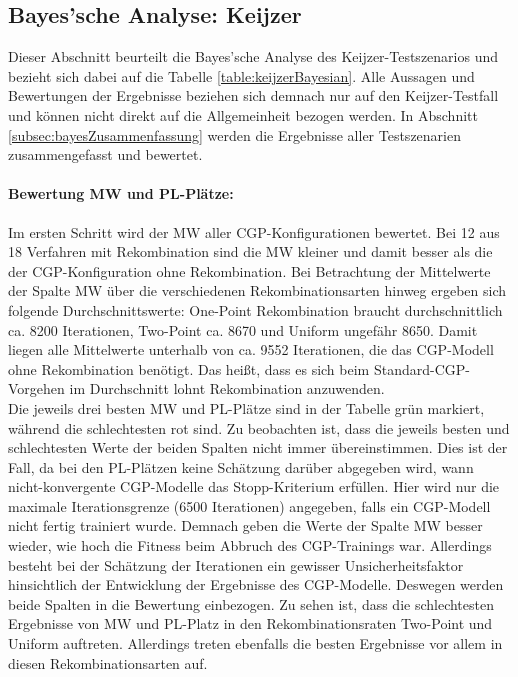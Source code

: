 \subsection{Bayes'sche Analyse: Keijzer}
\label{subsec:bayesKeijzer}

Dieser Abschnitt beurteilt die Bayes'sche Analyse des Keijzer-Testszenarios und bezieht sich dabei auf die Tabelle \ref{table:keijzerBayesian}.
Alle Aussagen und Bewertungen der Ergebnisse beziehen sich demnach nur auf den Keijzer-Testfall und können nicht direkt auf die Allgemeinheit bezogen werden.
In Abschnitt \ref{subsec:bayesZusammenfassung} werden die Ergebnisse aller Testszenarien zusammengefasst und bewertet.
\paragraph{Bewertung MW und PL-Plätze:}
Im ersten Schritt wird der MW aller CGP-Kon\-fi\-gu\-ra\-tio\-nen bewertet.
Bei 12 aus 18 Verfahren mit Rekombination sind die MW kleiner und damit besser als die der CGP-Konfiguration ohne Rekombination.
Bei Betrachtung der Mittelwerte der Spalte MW über die verschiedenen Rekombinationsarten hinweg ergeben sich folgende Durchschnittswerte: One-Point Rekombination braucht durchschnittlich ca. 8200 Iterationen, Two-Point ca. 8670 und Uniform ungefähr 8650.
Damit liegen alle Mittelwerte unterhalb von ca. 9552 Iterationen, die das CGP-Modell ohne Rekombination benötigt.
Das heißt, dass es sich beim Standard-CGP-Vorgehen im Durchschnitt lohnt Rekombination anzuwenden.\\
Die jeweils drei besten MW und PL-Plätze sind in der Tabelle grün markiert, während die schlechtesten rot sind.
Zu beobachten ist, dass die jeweils besten und schlechtesten Werte der beiden Spalten nicht immer übereinstimmen.
Dies ist der Fall, da bei den PL-Plätzen keine Schätzung darüber abgegeben wird, wann nicht-konvergente CGP-Modelle das Stopp-Kriterium erfüllen. 
Hier wird nur die maximale Iterationsgrenze (6500 Iterationen) angegeben, falls ein CGP-Modell nicht fertig trainiert wurde.
Demnach geben die Werte der Spalte MW besser wieder, wie hoch die Fitness beim Abbruch des CGP-Trainings war.
Allerdings besteht bei der Schätzung der Iterationen ein gewisser Unsicherheitsfaktor hinsichtlich der Entwicklung der Ergebnisse des CGP-Modelle.
Deswegen werden beide Spalten in die Bewertung einbezogen.
Zu sehen ist, dass die schlechtesten Ergebnisse von MW und PL-Platz in den Rekombinationsraten Two-Point und Uniform auftreten.
Allerdings treten ebenfalls die besten Ergebnisse vor allem in diesen Rekombinationsarten auf.
